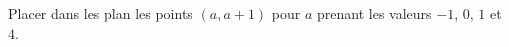 
\begin{exercice}\label{exoSeconde-0007}

    Placer dans les plan les points \( (a,a+1)\) pour \( a\) prenant les valeurs \( -1\), \( 0\), \( 1\) et \( 4\).

\end{exercice}

